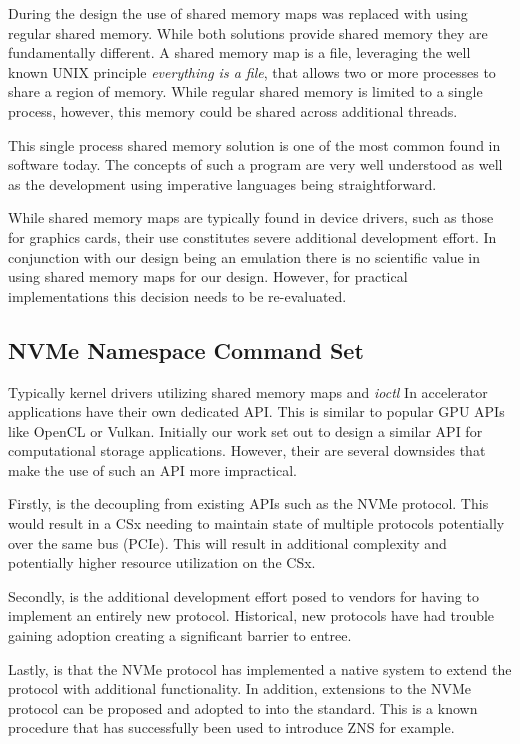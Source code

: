 During the design the use of shared memory maps was replaced with using regular
shared memory. While both solutions provide shared memory they are fundamentally
different. A shared memory map is a file, leveraging the well known UNIX
principle \textit{everything is a file}, that allows two or more processes to
share a region of memory. While regular shared memory is limited to a single
process, however, this memory could be shared across additional threads.

This single process shared memory solution is one of the most common found in
software today. The concepts of such a program are very well understood as
well as the development using imperative languages being straightforward.

While shared memory maps are typically found in device drivers, such as those
for graphics cards, their use constitutes severe additional development effort.
In conjunction with our design being an emulation there is no scientific value
in using shared memory maps for our design. However, for practical
implementations this decision needs to be re-evaluated.

\subsection{NVMe Namespace Command Set}

Typically kernel drivers utilizing shared memory maps and \textit{ioctl} In
accelerator applications have their own dedicated API. This is similar to
popular GPU APIs like OpenCL or Vulkan. Initially our work set out to design
a similar API for computational storage applications. However, their are several
downsides that make the use of such an API more impractical.

Firstly, is the decoupling from existing APIs such as the NVMe protocol. This
would result in a CSx needing to maintain state of multiple protocols
potentially over the same bus (PCIe). This will result in additional complexity
and potentially higher resource utilization on the CSx.

Secondly, is the additional development effort posed to vendors for having to
implement an entirely new protocol. Historical, new protocols have had trouble
gaining adoption creating a significant barrier to entree.

Lastly, is that the NVMe protocol has implemented a native system to extend the
protocol with additional functionality. In addition, extensions to the NVMe
protocol can be proposed and adopted to into the standard. This is a known
procedure that has successfully been used to introduce ZNS \cite{nvme-zns} for
example.

